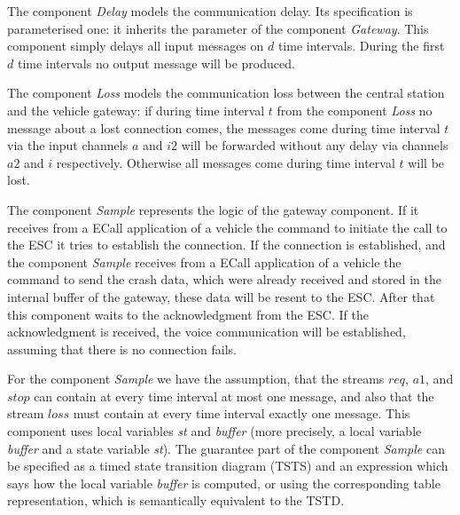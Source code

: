 \noindent
The component \emph{Delay} models the communication delay. 
Its specification is parameterised one: 
it inherits the parameter of the component \emph{Gateway}. 
This component simply delays all input messages on $d$ time intervals. 
During the first $d$ time intervals no output message will be produced. 

The component \emph{Loss} models the communication loss between 
the central station and the vehicle gateway: 
if during time interval $t$ from the component \emph{Loss} no message about a 
lost connection comes, the messages come during time interval 
$t$ via the input channels $a$ and $i2$ will be forwarded without any delay via channels 
$a2$ and $i$ respectively. 
Otherwise all messages come during time interval 
$t$ will be lost.  
  
The component \emph{Sample} represents the logic of the gateway component. 
If it receives from a ECall application of a vehicle 
 the command to initiate the call to the ESC it tries 
 to establish the connection.
If the connection is established, and the component \emph{Sample} receives 
from a ECall application of a vehicle
 the command to send the crash data, which were already received and stored 
 in the internal buffer of the gateway, 
 these data will be resent to the ESC. 
 After that this component waits to the acknowledgment from the ESC. 
 If the acknowledgment is received, the voice communication will be established, assuming that
	there is no connection fails.

For the component \emph{Sample} we have the assumption, that the 
streams $req$, $a1$, and $stop$ can contain at every time interval at most one message, 
and also that the stream $loss$ must contain at every time interval exactly one message. 
This component uses local variables \emph{st} and \emph{buffer} (more precisely, 
a local variable \emph{buffer} and a state variable \emph{st}). 
The guarantee part of  the component \emph{Sample} can be specified as a timed state transition diagram  (TSTS) 
and an expression which says how the local variable 
\emph{buffer} is computed, or using the corresponding table representation, which is semantically equivalent to the TSTD.  
  
